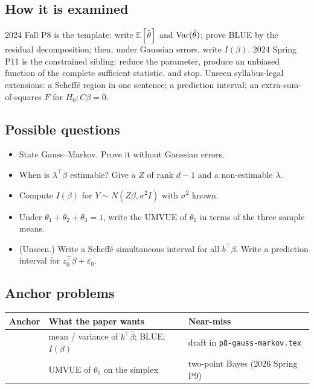 \subsection{How it is examined}

2024 Fall P8 is the template: write \(\mathbb{E}[\hat\theta]\) and \(\operatorname{Var}(\hat\theta)\); prove BLUE by the residual decomposition; then, under Gaussian errors, write \(I(\beta)\). 2024 Spring P11 is the constrained sibling: reduce the parameter, produce an unbiased function of the complete sufficient statistic, and stop. Unseen syllabus-legal extensions: a Scheff\'e region in one sentence; a prediction interval; an extra-sum-of-squares \(F\) for \(H_{0}:C\beta=0\).

\subsection{Possible questions}

\begin{itemize}
    \item State Gauss--Markov. Prove it without Gaussian errors.
    \item When is \(\lambda^{\top}\beta\) estimable? Give a \(Z\) of rank \(d-1\) and a non-estimable \(\lambda\).
    \item Compute \(I(\beta)\) for \(Y\sim N(Z\beta,\sigma^{2}I)\) with \(\sigma^{2}\) known.
    \item Under \(\theta_{1}+\theta_{2}+\theta_{3}=1\), write the UMVUE of \(\theta_{1}\) in terms of the three sample means.
    \item (Unseen.) Write a Scheff\'e simultaneous interval for all \(b^{\top}\beta\). Write a prediction interval for \(z_{0}^{\top}\beta+\varepsilon_{0}\).
\end{itemize}

\subsection{Anchor problems}

{\footnotesize
\begin{center}
\begin{tabular}{@{}L{2.7cm}L{5.4cm}L{6.1cm}@{}}
\toprule
Anchor & What the paper wants & Near-miss \\
\midrule
{} & mean / variance of \(b^{\top}\hat\beta\); BLUE; \(I(\beta)\) & draft in \texttt{p8-gauss-markov.tex} \\
 & UMVUE of \(\theta_{1}\) on the simplex & two-point Bayes (2026 Spring P9) \\
\bottomrule
\end{tabular}
\end{center}
}
